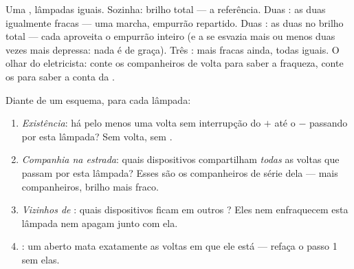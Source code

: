 \begin{example}\label{ex:g7:circuits-series-parallel:brightness}
Uma , lâmpadas iguais. Sozinha: brilho total --- a referência.
Duas : as duas igualmente fracas --- uma marcha, empurrão
repartido. Duas : as duas no brilho total --- cada 
aproveita o empurrão inteiro (e a  se esvazia mais ou menos duas
vezes mais depressa: nada é de graça). Três : mais fracas
ainda, todas iguais. O olhar do eletricista: conte os companheiros de
volta para saber a fraqueza, conte os  para saber a conta da
.
\end{example}

\begin{method}\label{met:g7:circuits-series-parallel:predict}
Diante de um esquema, para cada lâmpada:
\begin{enumerate}
  \item \emph{Existência}: há pelo menos uma volta sem interrupção do
        $+$ até o $-$ passando por esta lâmpada? Sem volta, sem .
  \item \emph{Companhia na estrada}: quais dispositivos compartilham
        \emph{todas} as voltas que passam por esta lâmpada? Esses são
        os companheiros de série dela --- mais companheiros, brilho
        mais fraco.
  \item \emph{Vizinhos de }: quais dispositivos ficam em outros
        ? Eles nem enfraquecem esta lâmpada nem apagam junto com
        ela.
  \item \emph{}: um  aberto mata exatamente
        as voltas em que ele está --- refaça o passo 1 sem elas.
\end{enumerate}
\end{method}

